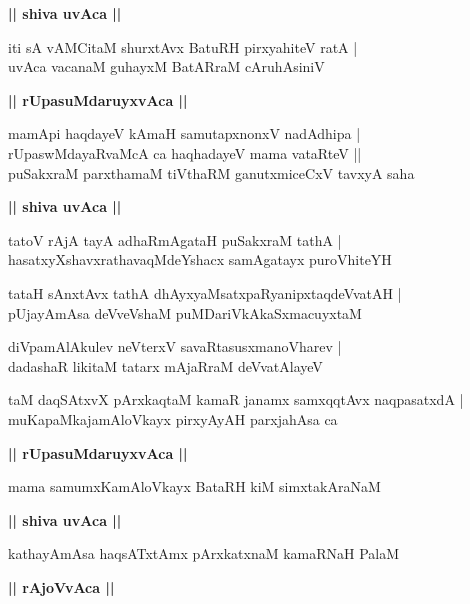 \documentclass[twoside,12pt,openright]{book}
\newcounter{shloka}[chapter]
\def\uvaca#1{\centerline{{\large\textbf{#1}}}}
\begin{document}
\uvaca{|| shiva uvAca ||}

\begin{shloka}%
iti sA vAMCitaM shurxtAvx BatuRH pirxyahiteV ratA |\\
uvAca vacanaM guhayxM BatARraM cAruhAsiniV
\end{shloka}

\uvaca{|| rUpasuMdaruyxvAca ||}

\begin{shloka}%
mamApi haqdayeV kAmaH samutapxnonxV nadAdhipa |\\
rUpaswMdayaRvaMcA ca haqhadayeV mama vataRteV ||\\
puSakxraM parxthamaM tiVthaRM ganutxmiceCxV tavxyA saha
\end{shloka}

\uvaca{|| shiva uvAca ||}

\begin{shloka}%
tatoV rAjA tayA adhaRmAgataH puSakxraM tathA |\\
hasatxyXshavxrathavaqMdeYshacx samAgatayx puroVhiteYH 
\end{shloka}

\begin{shloka}%
tataH sAnxtAvx tathA dhAyxyaMsatxpaRyanipxtaqdeVvatAH |\\
pUjayAmAsa deVveVshaM puMDariVkAkaSxmacuyxtaM 
\end{shloka}

\begin{shloka}%
diVpamAlAkulev neVterxV savaRtasusxmanoVharev |\\
dadashaR likitaM tatarx mAjaRraM deVvatAlayeV 
\end{shloka}

\begin{shloka}%
taM daqSAtxvX pArxkaqtaM kamaR janamx samxqqtAvx naqpasatxdA |\\
muKapaMkajamAloVkayx pirxyAyAH parxjahAsa ca 
\end{shloka}
\uvaca{|| rUpasuMdaruyxvAca ||}

\begin{shloka}%
mama samumxKamAloVkayx BataRH kiM simxtakAraNaM 
\end{shloka}

\uvaca{|| shiva uvAca ||}

\begin{shloka}%
kathayAmAsa haqsATxtAmx pArxkatxnaM kamaRNaH PalaM 
\end{shloka}

\uvaca{|| rAjoVvAca ||}
\end{document}
